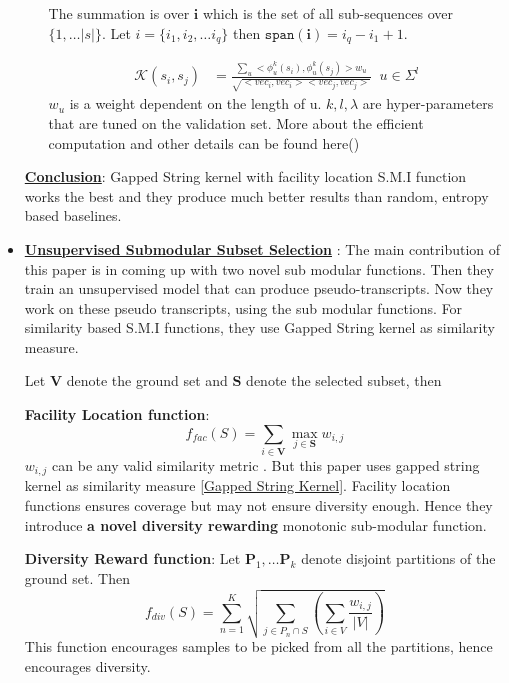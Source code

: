 \documentclass[12pt, a4paper, twoside]{article}
\begin{document}
\begin{itemize}
\begin{itemize}
        The summation is over $\mathbf{i}$ which is the set of all sub-sequences over $\{ 1, \ldots |s|\}$. Let $i = \{i_1, i_2, \ldots i_q\}$ then $\mathtt{span}(\mathbf{i}) = i_q - i_1 + 1$. 
        
        \begin{align*}
            \mathcal{K}(s_i, s_j) &= \frac{\sum_u{<\phi^k_u(s_i), \phi^k_u(s_j)>w_u}}{\sqrt{<vec_i, vec_i> <vec_j, vec_j>}}\;\; u \in \Sigma^l
        \end{align*}
        $w_u$ is a weight dependent on the length of u.
        $k, l, \lambda$ are hyper-parameters that are tuned on the validation set. More about the efficient computation and other details can be found here(\cite{rousu2005efficient})
    \end{itemize}
    
    \underline{\textbf{Conclusion}}: Gapped String kernel with facility location S.M.I function works the best and they produce much better results than random, entropy based baselines.  
    
    \item \underline{\textbf{Unsupervised Submodular Subset Selection}} \cite{wei2014unsupervised}: The main contribution of this paper is in coming up with two novel sub modular functions. Then they train an unsupervised model that can produce pseudo-transcripts. Now they work on these pseudo transcripts, using the sub modular functions. For similarity based S.M.I functions, they use Gapped String kernel as similarity measure.
    
    Let $\mathbf{V}$ denote the ground set and $\mathbf{S}$ denote the selected subset, then 
    
    \textbf{Facility Location function}: $$f_{fac}(S) = \sum_{i \in \mathbf{V}} \max_{j \in \mathbf{S}} w_{i,j}$$
    $w_{i,j}$ can be any valid similarity metric . But this paper uses gapped string kernel as similarity measure \ref{Gapped String Kernel}. Facility location functions ensures coverage but may not ensure diversity enough. Hence they introduce \textbf{a novel diversity rewarding} monotonic sub-modular function.
    
    \textbf{Diversity Reward function}: Let $\mathbf{P}_1, \ldots \mathbf{P}_k$ denote disjoint partitions of the ground set. Then 
    $$
        f_{div}(S) = \sum_{n=1}^K{\sqrt{\sum_{j \in P_n \cap S}{\left(\sum_{i \in V}{\frac{w_{i,j}}{|V|}}\right)}}}
    $$
    This function encourages samples to be picked from all the partitions, hence encourages diversity.
    

\end{itemize}
\end{document}
